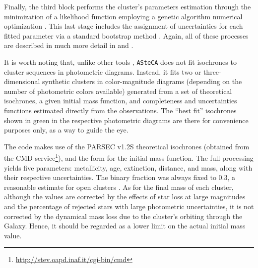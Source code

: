 \documentclass[draft]{aa}
\begin{document}
Finally, the third block performs the cluster's parameters estimation through
the minimization of a likelihood function \citep{Dolphin_2002} employing a
genetic algorithm numerical optimization \citep{Charbonneau_1995}. This last
stage includes the assignment of uncertainties for each fitted parameter via a
standard bootstrap method \citep{efron1986}. Again, all of these processes are
described in much more detail in \cite{Perren_2015} and \cite{Perren_2017}.

It is worth noting that, unlike other tools \citep[e.g.:][]{Yen_2018},
\texttt{ASteCA} does not fit isochrones to cluster sequences in photometric
diagrams. Instead, it fits two or three-dimensional synthetic
clusters in color-magnitude diagrams (depending on the number of photometric
colors available) generated from a set of theoretical isochrones, a given
initial mass function, and completeness and uncertainties functions estimated
directly from the observations. The ``best fit'' isochrones shown in green in
the respective photometric diagrams are there for convenience purposes only, as
a way to guide the eye.

The code makes use of the PARSEC v1.2S \citep{Bressan_2012} theoretical
isochrones (obtained from the CMD
service\footnote{\url{http://stev.oapd.inaf.it/cgi-bin/cmd}}), and the
\cite{Kroupa_2002} form for the initial mass function. The full processing
yields five parameters: metallicity, age, extinction,
distance, and mass, along with their respective uncertainties. The binary
fraction was always fixed to 0.3, a reasonable
estimate for open clusters \citep{Sollima_2010}. As for the final mass of each
cluster, although the values are corrected by the effects of star loss at large
magnitudes and the percentage of rejected stars with large photometric
uncertainties, it is not corrected by the dynamical mass loss due to the
cluster's orbiting through the Galaxy. Hence, it should be regarded as a lower
limit on the actual initial mass value.
\end{document}
